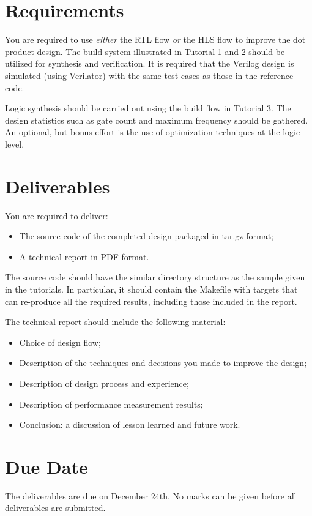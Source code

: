 \documentclass[12pt]{article}
\begin{document}
\section{Requirements}

You are required to use {\em either} the RTL flow {\em or} the HLS
flow to improve the dot product design.  The build system illustrated
in Tutorial 1 and 2 should be utilized for synthesis and
verification. It is required that the Verilog design is simulated
(using Verilator) with the same test cases as those in the reference
code.

Logic synthesis should be carried out using the build flow in
Tutorial 3. The design statistics such as gate count and maximum
frequency should be gathered. An optional, but bonus effort is the use
of optimization techniques at the logic level.

\section{Deliverables}

You are required to deliver:

\begin{itemize}
  \item The source code of the completed design packaged in tar.gz format;
  \item A technical report in PDF format. 
\end{itemize}

The source code should have the similar directory structure as the
sample given in the tutorials. In particular, it should contain the
Makefile with targets that can re-produce all the required results,
including those included in the report.

The technical report should include the following material:

\begin{itemize}
  \item Choice of design flow;
  \item Description of the techniques and decisions you made to improve the design;
   \item Description of design process and experience;
  \item Description of performance measurement results;
  \item Conclusion: a discussion of lesson learned and
        future work.
\end{itemize}

\section{Due Date}

The deliverables are due on December 24th. No marks can be given
before all deliverables are submitted.
\end{document}
